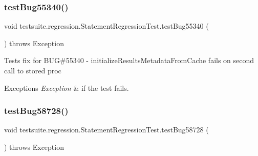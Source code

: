 \subsubsection{\texorpdfstring{test\+Bug55340()}{testBug55340()}}
{\footnotesize\ttfamily void testsuite.\+regression.\+Statement\+Regression\+Test.\+test\+Bug55340 (\begin{DoxyParamCaption}{ }\end{DoxyParamCaption}) throws Exception}

Tests fix for B\+UG\#55340 -\/ initialize\+Results\+Metadata\+From\+Cache fails on second call to stored proc


\begin{DoxyExceptions}{Exceptions}
{\em Exception} & if the test fails. \\
\hline
\end{DoxyExceptions}
\mbox{\label{classtestsuite_1_1regression_1_1_statement_regression_test_a84dc5a1748d9651df8f09ae7b8e2fd2b}} 
\subsubsection{\texorpdfstring{test\+Bug58728()}{testBug58728()}}
{\footnotesize\ttfamily void testsuite.\+regression.\+Statement\+Regression\+Test.\+test\+Bug58728 (\begin{DoxyParamCaption}{ }\end{DoxyParamCaption}) throws Exception}

